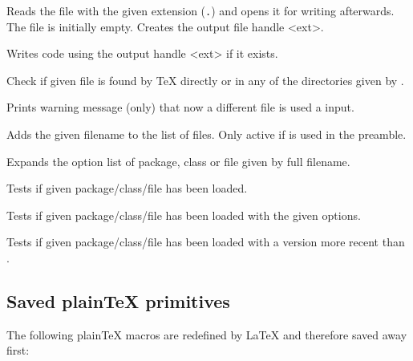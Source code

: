 \documentclass[12pt,a4paper]{article}
\begin{document}
\DescribeMacro{}
\noindent
Reads the file with the given extension (\texttt{\string\jobname.}) and opens it for
writing afterwards. The file is initially empty. Creates the output file handle \Macro\tf@<ext>.

\DescribeMacro{}
\noindent
Writes code using the output handle \Macro\tf@<ext> if it exists.


\DescribeMacro{}
\noindent
Check if given file is found by \TeX{} directly or in any of the directories given by . 

\DescribeMacro{}
\noindent
Prints warning message (only) that now a different file is used a input.

\DescribeMacro{}
\noindent
Adds the given filename to the list of files. Only active if  is used in the preamble. 

\DescribeMacro{}
\noindent
Expands the option list of package, class or file given by full filename. 

\DescribeMacro{}
\DescribeMacro{}
\DescribeMacro{}
Tests if given package/class/file has been loaded.


\DescribeMacros
\Macro{}
\Macro{}
\Macro{}
\endDescribeMacros
\noindent
Tests if given package/class/file has been loaded with the given options.

\DescribeMacros
\Macro{}
\Macro{}
\Macro{}
\endDescribeMacros
\noindent
Tests if given package/class/file has been loaded with a version more recent than .


\subsection{Saved plain\TeX{} primitives}
The following plain\TeX{} macros are redefined by \LaTeX{} and therefore saved away first:
\end{document}

